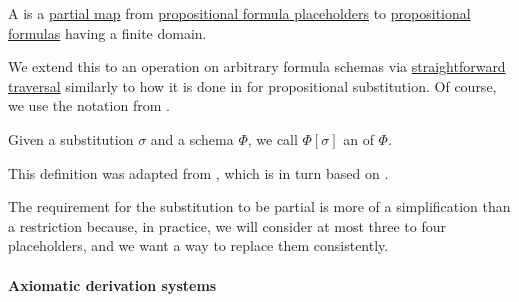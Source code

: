 \begin{definition}\label{def:propositional_schema_substitution}\mimprovised
  A  is a \hyperref[def:set_valued_map/partial]{partial map} from \hyperref[def:propositional_formula_schema]{propositional formula placeholders} to \hyperref[def:propositional_syntax/formula]{propositional formulas} having a finite domain.

  We extend this to an operation on arbitrary formula schemas via \hyperref[rem:straightforward_traversal]{straightforward traversal} similarly to how it is done in  for propositional substitution. Of course, we use the notation from .

  Given a substitution \( \sigma \) and a schema \( \Phi \), we call \( \Phi[\sigma] \) an  of \( \Phi \).
\end{definition}
\begin{comments}
  \item This definition was adapted from , which is in turn based on \cite[def. 3.1.3]{CitkinMuravitsky2021ConsequenceRelations}.

  \item The requirement for the substitution to be partial is more of a simplification than a restriction because, in practice, we will consider at most three to four placeholders, and we want a way to replace them consistently.
\end{comments}

\paragraph{Axiomatic derivation systems}

